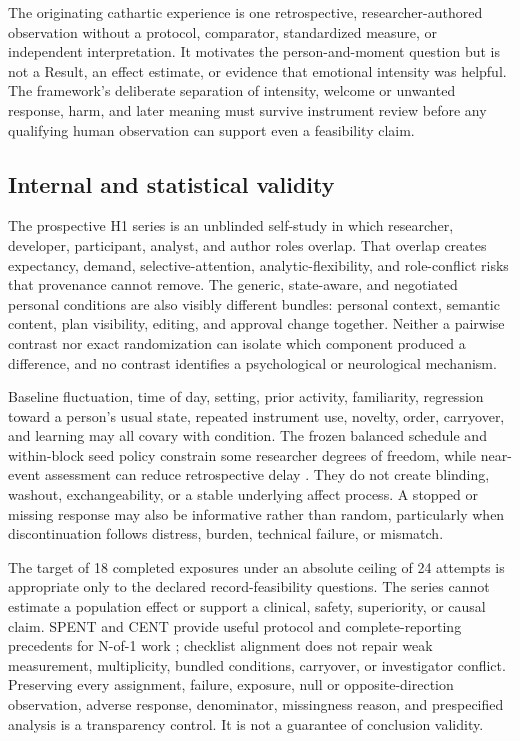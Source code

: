 The originating cathartic experience is one retrospective, researcher-authored
observation without a protocol, comparator, standardized measure, or independent
interpretation. It motivates the person-and-moment question but is not a Result,
an effect estimate, or evidence that emotional intensity was helpful. The
framework's deliberate separation of intensity, welcome or unwanted response,
harm, and later meaning must survive instrument review before any qualifying
human observation can support even a feasibility claim.

\subsection{Internal and statistical validity}
\label{sec:limitations-internal-validity}

The prospective H1 series is an unblinded self-study in which researcher,
developer, participant, analyst, and author roles overlap. That overlap creates
expectancy, demand, selective-attention, analytic-flexibility, and role-conflict
risks that provenance cannot remove. The generic, state-aware, and negotiated
personal conditions are also visibly different bundles: personal context,
semantic content, plan visibility, editing, and approval change together.
Neither a pairwise contrast nor exact randomization can isolate which component
produced a difference, and no contrast identifies a psychological or
neurological mechanism.

Baseline fluctuation, time of day, setting, prior activity, familiarity,
regression toward a person's usual state, repeated instrument use, novelty,
order, carryover, and learning may all covary with condition. The frozen
balanced schedule and within-block seed policy constrain some researcher
degrees of freedom, while near-event assessment can reduce retrospective delay
\citep{shiffman2008ema}. They do not create blinding, washout, exchangeability,
or a stable underlying affect process. A stopped or missing response may also be
informative rather than random, particularly when discontinuation follows
distress, burden, technical failure, or mismatch.

The target of 18 completed exposures under an absolute ceiling of 24 attempts
is appropriate only to the declared record-feasibility questions. The series
cannot estimate a population effect or support a clinical, safety, superiority,
or causal claim. SPENT and CENT provide useful protocol and complete-reporting
precedents for N-of-1 work \citep{porcino2020spent,vohra2015cent}; checklist
alignment does not repair weak measurement, multiplicity, bundled conditions,
carryover, or investigator conflict. Preserving every assignment, failure,
exposure, null or opposite-direction observation, adverse response, denominator,
missingness reason, and prespecified analysis is a transparency control. It is
not a guarantee of conclusion validity.

